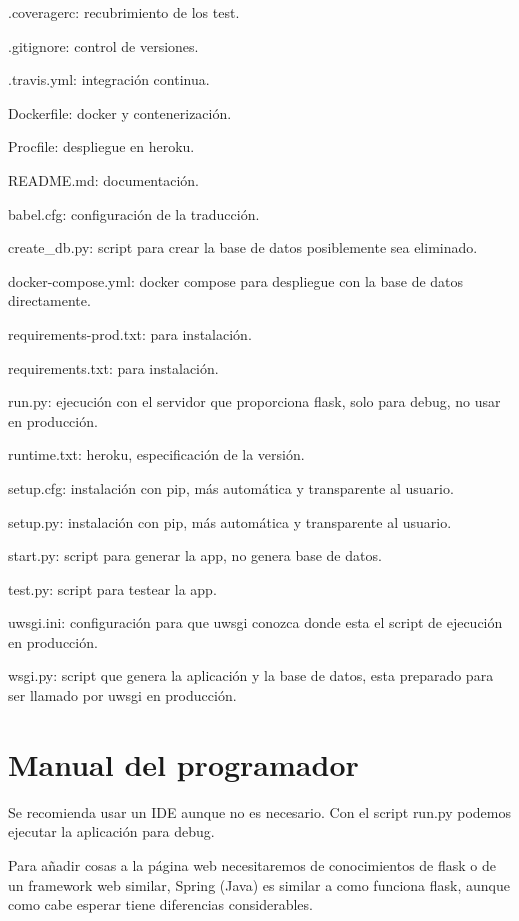 \begin{list}{-}{}
\begin{list}{*}{}
\item .coveragerc: recubrimiento de los test.
\item .gitignore: control de versiones.
\item .travis.yml: integración continua.
\item Dockerfile: docker y contenerización.
\item Procfile: despliegue en heroku.
\item README.md: documentación.
\item babel.cfg: configuración de la traducción.
\item create_db.py: script para crear la base de datos posiblemente sea eliminado.
\item docker-compose.yml: docker compose para despliegue con la base de datos directamente.
\item requirements-prod.txt: para instalación.
\item requirements.txt: para instalación.
\item run.py: ejecución con el servidor que proporciona flask, solo para debug, no usar en producción.
\item runtime.txt: heroku, especificación de la versión.
\item setup.cfg: instalación con pip, más automática y transparente al usuario. 
\item setup.py: instalación con pip, más automática y transparente al usuario. 
\item start.py: script para generar la app, no genera base de datos.
\item test.py: script para testear la app. 
\item uwsgi.ini: configuración para que uwsgi conozca donde esta el script de ejecución en producción.
\item wsgi.py: script que genera la aplicación y la base de datos, esta preparado para ser llamado por uwsgi en producción.
\end{list} 
\end{list}
\section{Manual del programador}

Se recomienda usar un IDE aunque no es necesario. Con el script run.py podemos ejecutar la aplicación para debug. 

Para añadir cosas a la página web necesitaremos de conocimientos de flask o de un framework web similar, Spring (Java) es similar a como funciona flask, aunque como cabe esperar tiene diferencias considerables.

